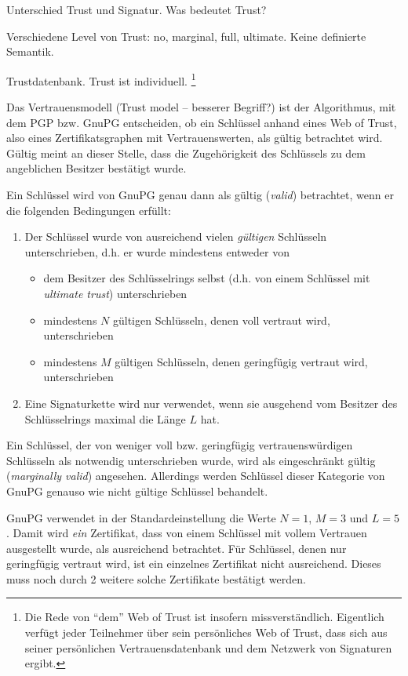 Unterschied Trust und Signatur. Was bedeutet Trust?

Verschiedene Level von Trust: no, marginal, full, ultimate. Keine
definierte Semantik.

Trustdatenbank. Trust ist individuell. \footnote{Die Rede von ``dem''
  Web of Trust ist insofern missverst\"andlich. Eigentlich verf\"ugt
  jeder Teilnehmer \"uber sein pers\"onliches Web of Trust, dass sich
  aus seiner pers\"onlichen Vertrauensdatenbank und dem Netzwerk von
  Signaturen ergibt.}

Das Vertrauensmodell (Trust model -- besserer Begriff?) ist der
Algorithmus, mit dem PGP bzw. GnuPG entscheiden, ob ein Schl\"ussel
anhand eines Web of Trust, also eines Zertifikatsgraphen mit
Vertrauenswerten, als g\"ultig betrachtet wird. G\"ultig meint an
dieser Stelle, dass die Zugeh\"origkeit des Schl\"ussels zu dem
angeblichen Besitzer best\"atigt wurde.

Ein Schlüssel wird von GnuPG genau dann als gültig (\emph{valid})
betrachtet, wenn er die folgenden Bedingungen erfüllt:

\begin{enumerate}
\item Der Schlüssel wurde von ausreichend vielen \emph{gültigen} Schlüsseln
  unterschrieben, d.h. er wurde mindestens entweder von
  \begin{itemize}
  \item dem Besitzer des Schlüsselrings selbst (d.h. von einem
    Schlüssel mit \emph{ultimate trust}) unterschrieben
  \item mindestens $N$ gültigen Schlüsseln, denen voll vertraut wird, unterschrieben
  \item mindestens $M$ gültigen Schlüsseln, denen geringfügig
    vertraut wird, unterschrieben
  \end{itemize}
\item Eine Signaturkette wird nur verwendet, wenn sie ausgehend vom
  Besitzer des Schlüsselrings maximal die Länge $L$ hat.
\end{enumerate}

Ein Schlüssel, der von weniger voll bzw. geringfügig
vertrauenswürdigen Schlüsseln als notwendig unterschrieben wurde, wird
als eingeschränkt gültig (\emph{marginally valid})
angesehen. Allerdings werden Schlüssel dieser Kategorie von GnuPG
genauso wie nicht gültige Schlüssel behandelt.

GnuPG verwendet in der Standardeinstellung die Werte $N=1$, $M=3$ und
$L=5$. Damit wird \emph{ein} Zertifikat, dass von einem Schl\"ussel
mit vollem Vertrauen ausgestellt wurde, als ausreichend
betrachtet. F\"ur Schl\"ussel, denen nur geringf\"ugig vertraut wird,
ist ein einzelnes Zertifikat nicht ausreichend. Dieses muss noch durch
2 weitere solche Zertifikate best\"atigt werden. 

